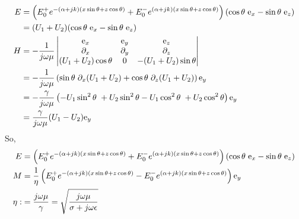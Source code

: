 \documentclass{article}
\numberwithin{equation}{section}
\begin{document}
            \begin{align*}
                E &= \left( E_0^+ e^{-(\alpha + jk)(x \sin \theta + z \cos \theta)} +
                    E_0^- e^{(\alpha + jk)(x \sin \theta + z \cos \theta)} \right) (
                    \cos \theta \hspace{0.3em} \text{e}_x - \sin \theta \hspace{0.3em}
                    \text{e}_z ) \\
                &= (U_1 + U_2)( \cos \theta \hspace{0.3em} \text{e}_x - \sin \theta
                    \hspace{0.3em} \text{e}_z ) \\
                H &= - \frac{1}{j \omega \mu}
                    \begin{vmatrix} 
                        \text{e}_x & \text{e}_y & \text{e}_z \\
                        \partial_x & \partial_y & \partial_z \\ 
                        (U_1 + U_2) \cos \theta & 0 & - (U_1 + U_2)\sin \theta
                    \end{vmatrix}
                    \\
                &= -\frac{1}{j \omega \mu} \left( \sin \theta \hspace{0.3em} \partial_x
                    (U_1 + U_2) + \cos \theta \hspace{0.3em} \partial_z (U_1 + U_2)
                    \right) \text{e}_y \\
                &= - \frac{\gamma }{j \omega \mu} \left( -U_1 \sin^2 \theta
                    \hspace{0.3em} + U_2 \sin^2 \theta -U_1 \cos^2 \theta \hspace{0.3em}
                    + U_2 \cos^2 \theta \right) \text{e}_y \\
                &= \frac{\gamma}{j \omega \mu}(U_1 - U_2) \text{e}_y
            \end{align*}
            So,
            \scriptsize
            \begin{subequations}
                \begin{align}
                    E &= \left( E_0^+ e^{-(\alpha + jk)(x \sin \theta + z \cos \theta)}
                        + E_0^- e^{(\alpha + jk)(x \sin \theta + z \cos \theta)} \right)
                        ( \cos \theta \hspace{0.3em} \text{e}_x - \sin \theta
                        \hspace{0.3em} \text{e}_z ) \\
                    M &= \frac{1}{\eta} \left( E_0^+ e^{-(\alpha + jk)(x \sin \theta + z
                        \cos \theta)} - E_0^- e^{(\alpha + jk )(x \sin \theta + z \cos
                        \theta)} \right) \text{e}_y \\
                    \eta :&= \frac{j \omega \mu }{\gamma} = \sqrt{\frac{j \omega
                        \mu}{\sigma + j \omega \epsilon}}
                \end{align}
            \end{subequations}
            \normalsize
\end{document}

